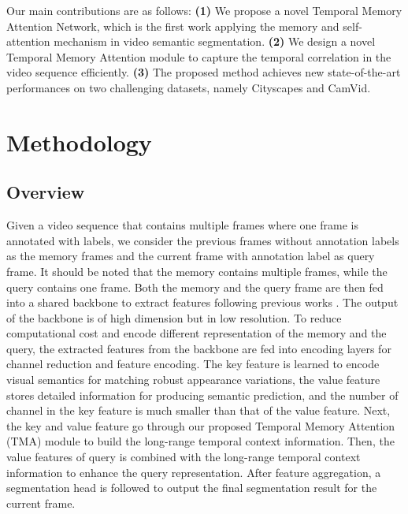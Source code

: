 \documentclass{article}
\begin{document}
	Our main contributions are as follows: 
	\textbf{(1)} We propose a novel Temporal Memory Attention Network, which is the first work applying the memory and self-attention mechanism in video semantic segmentation. 
	\textbf{(2)} We design a novel Temporal Memory Attention module to capture the temporal correlation in the video sequence efficiently. 
	\textbf{(3)} The proposed method achieves new state-of-the-art performances on two challenging datasets, namely Cityscapes and CamVid.
	
	\section{Methodology}
	\label{sec:approach}
	
	
	
	\subsection{Overview}
	


	
Given a video sequence that contains multiple frames where one frame is annotated with labels, we consider the previous frames without annotation labels as the memory frames and the current frame with annotation label as query frame. It should be noted that the memory contains multiple frames, while the query contains one frame. Both the memory and the query frame are then fed into a shared backbone to extract features following previous works \cite{TDNet2019, PSPNet2017, DANet2019}. The output of the backbone is of high dimension but in low resolution. To reduce computational cost and encode different representation of the memory and the query, the extracted features from the backbone are fed into encoding layers for channel reduction and feature encoding. The key feature is learned to encode visual semantics for matching robust appearance variations, the value feature stores detailed information for producing semantic prediction, and the number of channel in the key feature is much smaller than that of the value feature. Next, the key and value feature go through our proposed Temporal Memory Attention (TMA) module to build the long-range temporal context information. Then, the value features of query is combined with the long-range temporal context information to enhance the query representation. After feature aggregation, a segmentation head is followed to output the final segmentation result for the current frame.
\end{document}
